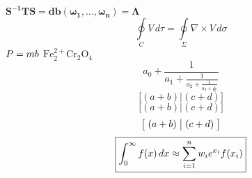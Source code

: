 \documentclass{article}
\begin{document}
	\fbox{\parbox{5cm}{\[ \int ^ \infty_0 f(x)\,dx \approx \sum_{i = 1}^n w_i e^{x_i} f(x_i) \]}}\\
		$\mathbf{S^{-1}TS = db(\omega_1, \ldots, \omega_n) = \Lambda}$
		\boldmath \[ \oint\limits_C V\,d\tau = \oint\limits_\Sigma\nabla\times V\,d\sigma \] \unboldmath
		\boldmath\(P = \mbox{\unboldmath$m$}b\) \unboldmath
		$\mathrm{Fe_2^{2+}Cr_2O_4}$
		\[ a_0 + \frac{1}{\displaystyle a_1
			  + \frac{1}{\displaystyle a_2
			  + \frac{1}{\displaystyle a_3
			 + \frac{1}{a_4}}}} \]
		\[ \big[(a+b)\big|(c+d) \big] \]
		\[ \bigl[(a+b) \bigl|(c+d) \bigl] \]
		\[ \bigm[(a+b) \bigm|(c+d) \bigm] \]
		\begin{equation}
			\fbox{$ \displaystyle \int^\infty_0 f(x)\, dx \approx \sum_{i = 1}^n w_i e^{x_i} f(x_i)$}
		\end{equation}
\end{document}
